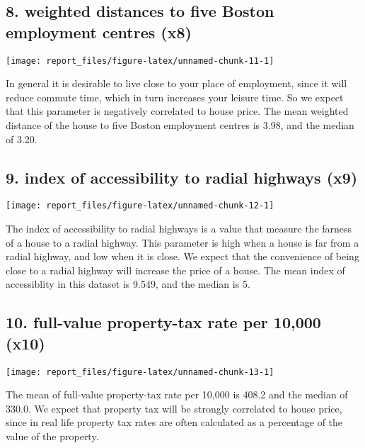 \documentclass[]{article}
\begin{document}
\subsection{8. weighted distances to five Boston employment centres
(x8)}\label{weighted-distances-to-five-boston-employment-centres-x8}

\begin{center}\texttt{[image: report\_files/figure-latex/unnamed-chunk-11-1]} \end{center}

In general it is desirable to live close to your place of employment,
since it will reduce commute time, which in turn increases your leisure
time. So we expect that this parameter is negatively correlated to house
price. The mean weighted distance of the house to five Boston employment
centres is 3.98, and the median of 3.20.

\subsection{9. index of accessibility to radial highways
(x9)}\label{index-of-accessibility-to-radial-highways-x9}

\begin{center}\texttt{[image: report\_files/figure-latex/unnamed-chunk-12-1]} \end{center}

The index of accessibility to radial highways is a value that measure
the farness of a house to a radial highway. This parameter is high when
a house is far from a radial highway, and low when it is close. We
expect that the convenience of being close to a radial highway will
increase the price of a house. The mean index of accessiblity in this
dataset is 9.549, and the median is 5.

\subsection{10. full-value property-tax rate per 10,000
(x10)}\label{full-value-property-tax-rate-per-10000-x10}

\begin{center}\texttt{[image: report\_files/figure-latex/unnamed-chunk-13-1]} \end{center}

The mean of full-value property-tax rate per 10,000 is 408.2 and the
median of 330.0. We expect that property tax will be strongly correlated
to house price, since in real life property tax rates are often
calculated as a percentage of the value of the property.
\end{document}
